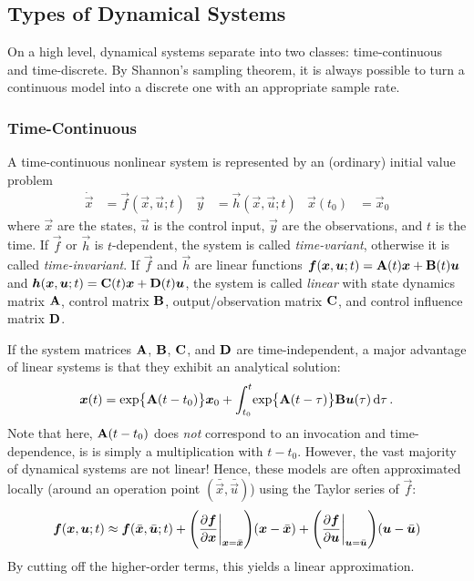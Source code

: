 		\subsection{Types of Dynamical Systems}
			On a high level, dynamical systems separate into two classes: time-continuous and time-discrete. By Shannon's sampling theorem, it is always possible to turn a continuous model into a discrete one with an appropriate sample rate.

			\subsubsection{Time-Continuous}
				A time-continuous nonlinear system is represented by an (ordinary) initial value problem
				\begin{align}
					\dot{\vec{x}} & = \vec{f}(\vec{x}, \vec{u}; t) &
					\vec{y}       & = \vec{h}(\vec{x}, \vec{u}; t) &
					\vec{x}(t_0)  & = \vec{x}_0
				\end{align}
				where \(\vec{x}\) are the states, \(\vec{u}\) is the control input, \(\vec{y}\) are the observations, and \(t\) is the time. If \(\vec{f}\) or \(\vec{h}\) is \(t\)-dependent, the system is called \emph{time-variant}, otherwise it is called \emph{time-invariant}. If \(\vec{f}\) and \(\vec{h}\) are linear functions \( \bm{f}(\bm{x}, \bm{u}; t) = \bm{\mathrm{A}}(t) \bm{x} + \bm{\mathrm{B}}(t) \bm{u} \) and \( \bm{h}(\bm{x}, \bm{u}; t) = \bm{\mathrm{C}}(t) \bm{x} + \bm{\mathrm{D}}(t) \bm{u} \), the system is called \emph{linear} with state dynamics matrix \(\bm{\mathrm{A}}\), control matrix \(\bm{\mathrm{B}}\), output/observation matrix \(\bm{\mathrm{C}}\), and control influence matrix \(\bm{\mathrm{D}}\).

				If the system matrices \(\bm{\mathrm{A}}\), \(\bm{\mathrm{B}}\), \(\bm{\mathrm{C}}\), and \(\bm{\mathrm{D}}\) are time-independent, a major advantage of linear systems is that they exhibit an analytical solution:
				\begin{equation}
					\bm{x}(t) = \exp\bigl\{ \bm{\mathrm{A}}(t - t_0) \bigr\} \bm{x}_0 + \int_{t_0}^{t}\! \exp\bigl\{ \bm{\mathrm{A}}(t - \tau) \bigr\} \bm{\mathrm{B}} \bm{u}(\tau) \dd{\tau}.
				\end{equation}
				Note that here, \( \bm{\mathrm{A}}(t - t_0) \) does \emph{not} correspond to an invocation and time-dependence, is is simply a multiplication with \(t - t_0\). However, the vast majority of dynamical systems are not linear! Hence, these models are often approximated locally (around an operation point \( (\bar{\vec{x}}, \bar{\vec{u}}) \)) using the Taylor series of \(\vec{f}\):
				\begin{equation}
					\bm{f}(\bm{x}, \bm{u}; t) \approx \bm{f}(\bar{\bm{x}}, \bar{\bm{u}}; t) + \Biggl( \pdv{\bm{f}}{\bm{x}}\bigg\vert_{\bm{x} = \bar{\bm{x}}} \Biggr) (\bm{x} - \bar{\bm{x}}) + \Biggl( \pdv{\bm{f}}{\bm{u}}\bigg\vert_{\bm{u} = \bar{\bm{u}}} \Biggr) (\bm{u} - \bar{\bm{u}})
				\end{equation}
				By cutting off the higher-order terms, this yields a linear approximation.

